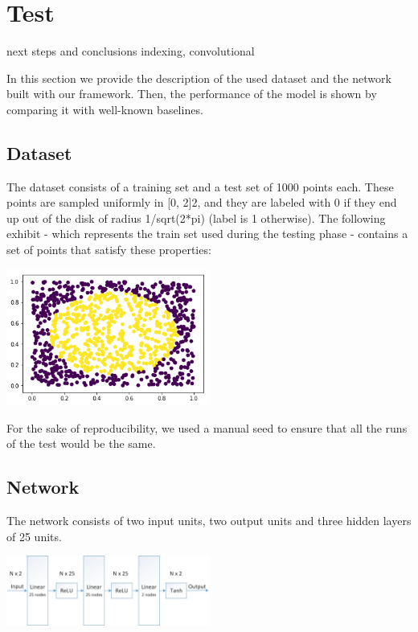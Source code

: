 \documentclass[10pt,conference,compsocconf]{IEEEtran}
\begin{document}
\section{Test}
next steps and conclusions 
 indexing, convolutional
 

In this section we provide the description of the used dataset and the network built with our framework. Then, the performance of the model is shown by comparing it with well-known baselines.

\subsection{Dataset}
The dataset consists of a training set and a test set of 1000 points each. These points are sampled uniformly in [0, 2]2, and they are labeled with 0 if they end up out of the disk of radius 1/sqrt(2*pi) (label is 1 otherwise). The following exhibit - which represents the train set used during the testing phase - contains a set of points that satisfy these properties:

\begin{center}
	\captionsetup{type=figure}
	\includegraphics[width=0.5\textwidth]{img/dataset.png}
	\label{fig:dataset}
\end{center} 

For the sake of reproducibility, we used a manual seed to ensure that all the runs of the test would be the same.

\subsection{Network}
The network consists of two input units, two output units and three hidden layers of 25 units.

\begin{center}
	\captionsetup{type=figure}
	\includegraphics[width=0.5\textwidth]{img/Network.jpg}
	\label{fig:network}
\end{center} 
\end{document}
